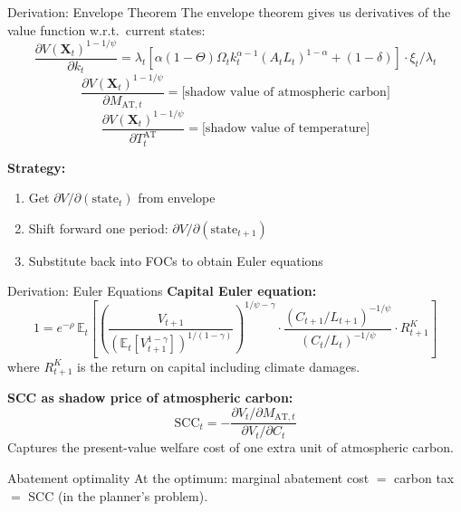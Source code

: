 \documentclass[aspectratio=169,11pt]{beamer}
\newcommand{\emphc}[1]{\textcolor{harvardcrimson}{#1}}
\newcommand{\X}{\bm{X}}
\begin{document}
\begin{frame}{Derivation: Envelope Theorem}
\small
The envelope theorem gives us derivatives of the value function w.r.t.\ \emphc{current} states:
\[
\frac{\partial V(\X_t)^{1-1/\psi}}{\partial k_t} = \lambda_t \left[\alpha (1-\Theta)\Omega_t k_t^{\alpha-1}(A_t L_t)^{1-\alpha} + (1-\delta)\right] \cdot \xi_t / \lambda_t
\]
\[
\frac{\partial V(\X_t)^{1-1/\psi}}{\partial M_{\mathrm{AT},t}} = \text{[shadow value of atmospheric carbon]}
\]
\[
\frac{\partial V(\X_t)^{1-1/\psi}}{\partial T^{\mathrm{AT}}_t} = \text{[shadow value of temperature]}
\]

\vspace{0.2cm}
\textbf{Strategy:}
\begin{enumerate}
    \item Get $\partial V / \partial(\text{state}_t)$ from envelope
    \item Shift forward one period: $\partial V / \partial(\text{state}_{t+1})$
    \item Substitute back into FOCs to obtain \emphc{Euler equations}
\end{enumerate}
\end{frame}

\begin{frame}{Derivation: Euler Equations}
\small
\textbf{Capital Euler equation:}
\[
1 = e^{-\rho}\, \mathbb{E}_t\!\left[\left(\frac{V_{t+1}}{(\mathbb{E}_t[V_{t+1}^{1-\gamma}])^{1/(1-\gamma)}}\right)^{1/\psi - \gamma} \cdot \frac{(C_{t+1}/L_{t+1})^{-1/\psi}}{(C_t/L_t)^{-1/\psi}} \cdot R_{t+1}^K\right]
\]
where $R_{t+1}^K$ is the return on capital including climate damages.

\vspace{0.2cm}
\textbf{SCC as shadow price of atmospheric carbon:}
\[
\mathrm{SCC}_t = -\frac{\partial V_t / \partial M_{\mathrm{AT},t}}{\partial V_t / \partial C_t}
\]
Captures the present-value welfare cost of one extra unit of atmospheric carbon.

\vspace{0.2cm}
\begin{exampleblock}{Abatement optimality}
At the optimum: marginal abatement cost $=$ carbon tax $=$ SCC (in the planner's problem).
\end{exampleblock}
\end{frame}
\end{document}

